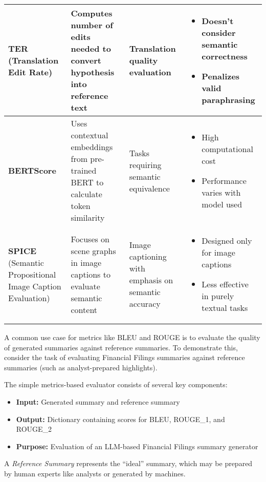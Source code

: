 \begin{table}[htbp]
\begin{tabular}{p{}p{}p{}p{}}
\hline
\textbf{TER} (Translation Edit Rate) & Computes number of edits needed to convert hypothesis into reference text & Translation quality evaluation & \begin{itemize}\item Doesn't consider semantic correctness\item Penalizes valid paraphrasing\end{itemize} \\
\hline
\textbf{BERTScore} & Uses contextual embeddings from pre-trained BERT to calculate token similarity & Tasks requiring semantic equivalence & \begin{itemize}\item High computational cost\item Performance varies with model used\end{itemize} \\
\hline
\textbf{SPICE} (Semantic Propositional Image Caption Evaluation) & Focuses on scene graphs in image captions to evaluate semantic content & Image captioning with emphasis on semantic accuracy & \begin{itemize}\item Designed only for image captions\item Less effective in purely textual tasks\end{itemize} \\
\hline
\end{tabular}
\end{table}
A common use case for metrics like BLEU and ROUGE is to evaluate the quality of generated summaries against reference summaries. To demonstrate this, consider the task of evaluating Financial Filings summaries against reference summaries (such as analyst-prepared highlights).

The simple metrics-based evaluator consists of several key components:
\begin{itemize}
    \item \textbf{Input:} Generated summary and reference summary
    \item \textbf{Output:} Dictionary containing scores for BLEU, ROUGE\_1, and ROUGE\_2
    \item \textbf{Purpose:} Evaluation of an LLM-based Financial Filings summary generator
\end{itemize}

A \textit{Reference Summary} represents the ``ideal'' summary, which may be prepared by human experts like analysts or generated by machines.

